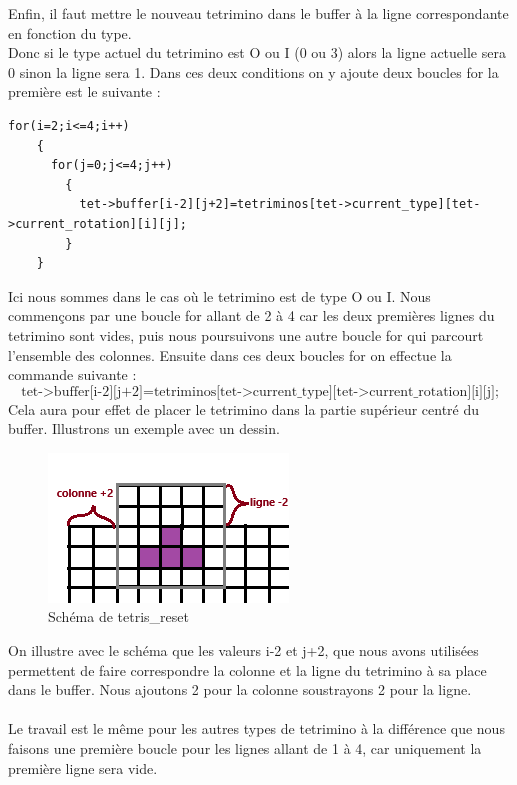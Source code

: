 \documentclass[a4paper,10p]{report}
\begin{document}
Enfin, il faut mettre le nouveau tetrimino dans le buffer à la ligne correspondante en fonction du type. 
\\Donc si le type actuel du tetrimino est O ou I (0 ou 3) alors la ligne actuelle sera 0 sinon la ligne sera 1. Dans ces deux conditions on y ajoute deux boucles for la première est le suivante :
\begin{lstlisting}
for(i=2;i<=4;i++)
	{
	  for(j=0;j<=4;j++)
	    {
	      tet->buffer[i-2][j+2]=tetriminos[tet->current_type][tet->current_rotation][i][j];
	    }
	}
\end{lstlisting}
Ici nous sommes dans le cas où le tetrimino est de type O ou I. Nous commençons par une boucle for allant de 2 à 4 car les deux premières lignes du tetrimino sont vides, puis nous poursuivons une autre boucle for qui parcourt l'ensemble des colonnes. Ensuite dans ces deux boucles for on effectue la commande suivante :
\begin{equation*}
    \text{tet->buffer[i-2][j+2]=tetriminos[tet->current\_type][tet->current\_rotation][i][j];}
\end{equation*}
Cela aura pour effet de placer le tetrimino dans la partie supérieur centré du buffer.
Illustrons un exemple avec un dessin.
\begin{figure}[ht]
\includegraphics[scale=1]{buffer_tetrimino.png}
\caption{\label{dessin3} Schéma de tetris\_reset}
\end{figure}
On illustre avec le schéma que les valeurs i-2 et j+2, que nous avons utilisées permettent de faire correspondre la colonne et la ligne du tetrimino à sa place dans le buffer. Nous ajoutons 2 pour la colonne soustrayons 2 pour la ligne.
\\\\
Le travail est le même pour les autres types de tetrimino à la différence que nous faisons une première boucle pour les lignes allant de 1 à 4, car uniquement la première ligne sera vide.

\newpage
\end{document}
